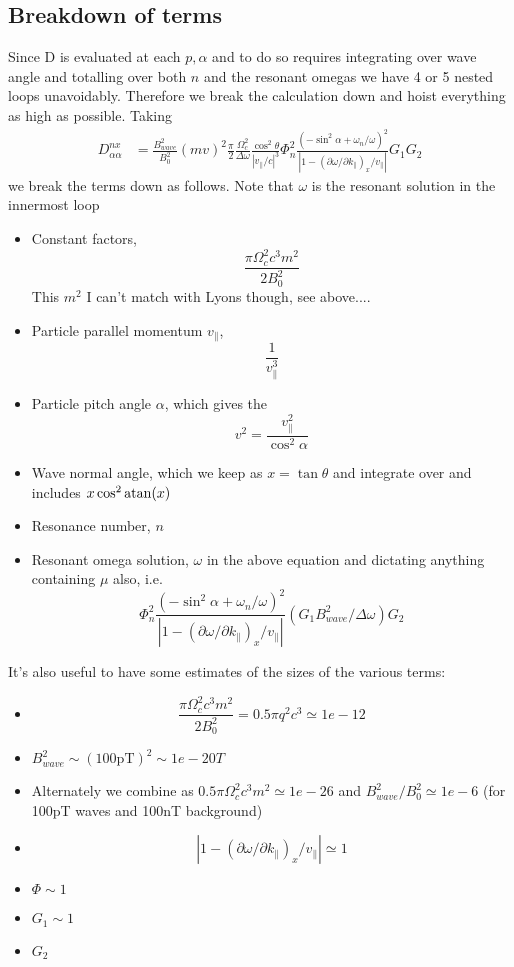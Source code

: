 \documentclass[]{article}
\begin{document}
\subsection{Breakdown of terms}
Since D is evaluated at each $p, \alpha$ and to do so requires integrating over wave angle and totalling over both $n$ and the resonant omegas we have 4 or 5 nested loops unavoidably. Therefore we break the calculation down and hoist everything as high as possible. Taking
\begin{align}
D_{\alpha\alpha}^{nx} &= \frac{B_{wave}^2}{B_0^2}(mv)^2 \frac{\pi}{2}\frac{\Omega_c^2}{\Delta\omega}\frac{\cos^2\theta}{|v_\parallel/c|^3}  \Phi_n^2 \frac{(-\sin^2\alpha + \omega_n/\omega)^2}{|1-(\partial \omega/\partial k_\parallel)_x/v_\parallel|} G_1 G_2 \end{align}
we break the terms down as follows. Note that $\omega$ is the resonant solution in the innermost loop
\begin{itemize}
\item Constant factors, \[ \frac{\pi \Omega_c^2 c^3 m^2}{2 B_0^2}\] This $m^2$ I can't match with Lyons though, see above....
\item Particle parallel momentum $v_\parallel$, \[\frac{1}{v_\parallel^3}\]
\item Particle pitch angle $\alpha$, which gives the \[ v^2 = \frac{v^2_\parallel}{\cos^2 \alpha}\]
\item Wave normal angle, which we keep as $x= \tan\theta$ and integrate over and includes $x \cos^2\mathrm{atan}(x)$
\item Resonance number, $n$
\item Resonant omega solution, $\omega$ in the above equation and dictating anything containing $\mu$ also, i.e. 
\[ \Phi_n^2 \frac{(-\sin^2\alpha + \omega_n/\omega)^2}{|1-(\partial \omega/\partial k_\parallel)_x/v_\parallel|} (G_1 B_{wave}^2/\Delta\omega) G_2 \]
\end{itemize}

\noindent It's also useful to have some estimates of the sizes of the various terms:
\begin{itemize}
\item \[ \frac{\pi \Omega_c^2 c^3 m^2}{2 B_0^2} = 0.5 \pi q^2 c^3 \simeq 1e-12 \]
\item $B^2_{wave} \sim (100 \mathrm{pT})^2 \sim 1e-20 T$
\item Alternately we combine as $ 0.5 \pi \Omega_c^2 c^3 m^2  \simeq 1e-26$ and $B^2_{wave}/B_0^2 \simeq 1e-6$ (for 100pT waves and 100nT background)
\item \[  |1-(\partial \omega/\partial k_\parallel)_x/v_\parallel| \simeq 1 \]
\item $\Phi \sim 1$
\item $G_1 \sim 1$
\item $G_2$
\end{itemize}
\end{document}
